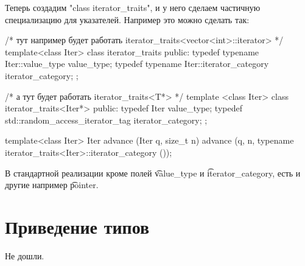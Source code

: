 Теперь создадим \cpp"class iterator_traits", и у него сделаем частичную специализацию для указателей.
Например это можно сделать так:
\begin{cppcode}
/* тут например будет работать iterator_traits<vector<int>::iterator> */
template<class Iter>
class iterator_traits {
public:
	typedef typename Iter::value_type value_type;
	typedef typename Iter::iterator_category iterator_category;
};

/* а тут будет работать iterator_traits<T*> */
template <class Iter> 
class iterator_traits<Iter*> {
public:
	typedef Iter value_type;
	typedef std::random_access_iterator_tag iterator_category;
};

template<class Iter>
Iter advance (Iter q, size_t n) {
	advance (q, n, typename iterator_traits<Iter>::iterator_category ());
}
\end{cppcode}
В стандартной реализации кроме полей \t{value\_type} и \t{iterator\_category}, есть и другие например \t{pointer}.

\section{Приведение типов}
Не дошли. 